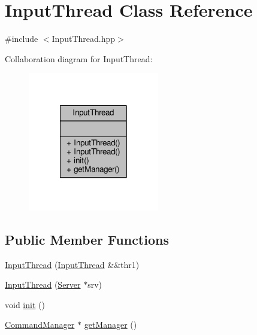 \hypertarget{class_input_thread}{\section{Input\-Thread Class Reference}
\label{class_input_thread}
}


{\ttfamily \#include $<$Input\-Thread.\-hpp$>$}



Collaboration diagram for Input\-Thread\-:
\nopagebreak
\begin{figure}[H]
\begin{center}
\leavevmode
\includegraphics[width=162pt]{class_input_thread__coll__graph}
\end{center}
\end{figure}
\subsection*{Public Member Functions}
\begin{DoxyCompactItemize}
\item 
\hyperlink{class_input_thread_a79ba754c063684c11485a951fac84e8b}{Input\-Thread} (\hyperlink{class_input_thread}{Input\-Thread} \&\&thr1)
\item 
\hyperlink{class_input_thread_a486139cd9105ce017bcf930dc3e0747b}{Input\-Thread} (\hyperlink{class_server}{Server} $\ast$srv)
\item 
void \hyperlink{class_input_thread_ac33f0f934c6dc40c7747b96e8b60a736}{init} ()
\item 
\hyperlink{class_command_manager}{Command\-Manager} $\ast$ \hyperlink{class_input_thread_afe7d8e3ff5db52b1fc1e49d408547388}{get\-Manager} ()
\end{DoxyCompactItemize}


